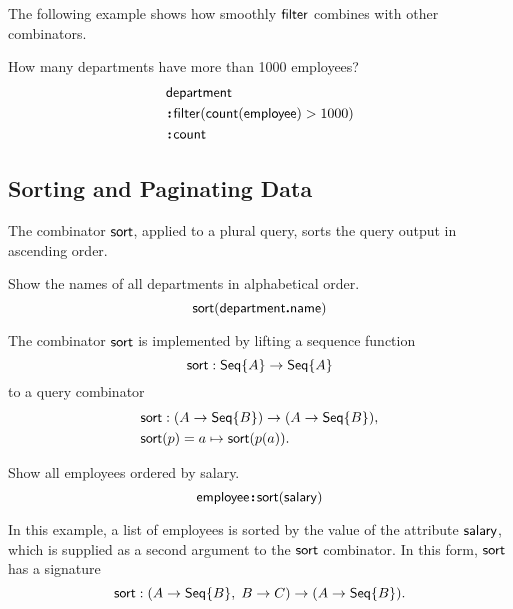 The following example shows how smoothly $\mathsf{filter}$ combines with other
combinators.

\begin{demo}
    \label{ex:filter-by-size-and-count}
    How many departments have more than 1000 employees?
    \begin{align*}
        & \mathsf{department} \\
        & \!\boldsymbol{:}\!\mathsf{filter}(\mathsf{count}(\mathsf{employee})>1000) \\
        & \!\boldsymbol{:}\!\mathsf{count}
    \end{align*}
\end{demo}

\subsection*{Sorting and Paginating Data}

The combinator $\mathsf{sort}$, applied to a plural query, sorts the query output in
ascending order.

\begin{demo}
    \label{ex:sort-department-name}
    Show the names of all departments in alphabetical order.
    \begin{equation*}
        \mathsf{sort}(\mathsf{department}\boldsymbol{.}\mathsf{name})
    \end{equation*}
\end{demo}

The combinator $\mathsf{sort}$ is implemented by lifting a sequence function
\begin{equation*}
    \mathsf{sort} : \mathsf{Seq}{\left\{A\right\}} \to \mathsf{Seq}{\left\{A\right\}}
\end{equation*}
to a query combinator
\begin{align*}
    & \mathsf{sort} : (A \to \mathsf{Seq}{\left\{B\right\}}) \to (A \to \mathsf{Seq}{\left\{B\right\}}), \\
    & \mathsf{sort}(p) = a \mapsto \mathsf{sort}(p(a)).
\end{align*}

\begin{demo}
    \label{ex:sort-employee-by-salary}
    Show all employees ordered by salary.
    \begin{equation*}
        \mathsf{employee}\!\boldsymbol{:}\!\mathsf{sort}(\mathsf{salary})
    \end{equation*}
\end{demo}

In this example, a list of employees is sorted by the value of the attribute
$\mathsf{salary}$, which is supplied as a second argument to the $\mathsf{sort}$ combinator.
In this form, $\mathsf{sort}$ has a signature
\begin{equation*}
    \mathsf{sort} : (A \to \mathsf{Seq}{\left\{B\right\}},\; B \to C) \to (A \to \mathsf{Seq}{\left\{B\right\}}).
\end{equation*}

